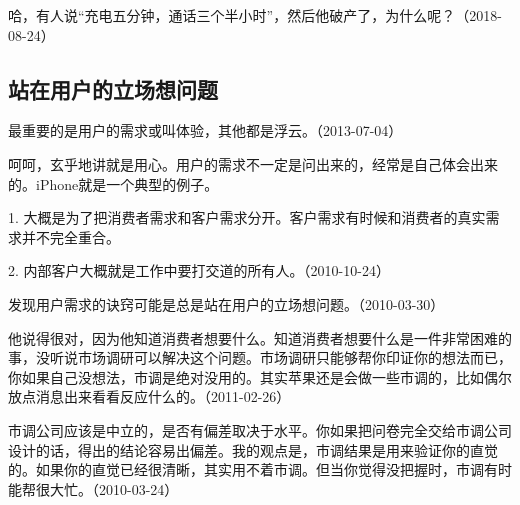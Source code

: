 
哈，有人说“充电五分钟，通话三个半小时”，然后他破产了，为什么呢？（2018-08-24）

\subsection{站在用户的立场想问题}


最重要的是用户的需求或叫体验，其他都是浮云。（2013-07-04）


呵呵，玄乎地讲就是用心。用户的需求不一定是问出来的，经常是自己体会出来的。iPhone就是一个典型的例子。

1. 大概是为了把消费者需求和客户需求分开。客户需求有时候和消费者的真实需求并不完全重合。

2. 内部客户大概就是工作中要打交道的所有人。（2010-10-24）


发现用户需求的诀窍可能是总是站在用户的立场想问题。（2010-03-30）


他说得很对，因为他知道消费者想要什么。知道消费者想要什么是一件非常困难的事，没听说市场调研可以解决这个问题。市场调研只能够帮你印证你的想法而已，你如果自己没想法，市调是绝对没用的。其实苹果还是会做一些市调的，比如偶尔放点消息出来看看反应什么的。（2011-02-26）


市调公司应该是中立的，是否有偏差取决于水平。你如果把问卷完全交给市调公司设计的话，得出的结论容易出偏差。我的观点是，市调结果是用来验证你的直觉的。如果你的直觉已经很清晰，其实用不着市调。但当你觉得没把握时，市调有时能帮很大忙。（2010-03-24）

